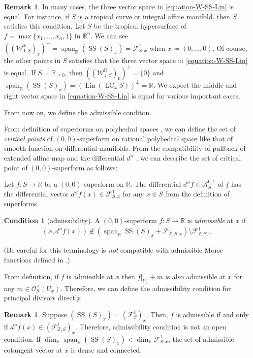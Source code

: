 \documentclass[a4paper,dvipdfmx,reqno,12pt]{amsart}
\theoremstyle{definition}
\newtheorem{remark}[theorem]{Remark}
\newtheorem{condition}[theorem]{Condition}
\newcommand{\deq}{\coloneqq}
\newcommand{\opn}[1]{\operatorname{#1}}
\numberwithin{equation}{section}
\begin{document}
\begin{remark}
In many cases, the three vector space in 
\cref{equation-W-SS-Lin} is equal.
For instance, if $S$ is a tropical curve 
or integral affine manifold, 
then $S$ satisfies this condition.
Let $S$ be the tropical hypersurface of
$f=\max\{x_1,\ldots,x_n,1\}$ in $\mathbb{R}^{n}$. 
We can see
$((\mathcal{W}_{1,S}^{\mathbb{R}})_{x})^{\bot}=\opn{span}_{{\mathbb{R}}}(\opn{SS}(S)_x)=\mathcal{F}_{S,x}^{1}$
when $x\deq (0,\ldots,0)$. 
Of course, the other points in $S$ satisfies 
that the three vector space in 
\cref{equation-W-SS-Lin} is equal. If 
$S=\mathbb{R}_{\geq 0}$, then 
$((\mathcal{W}_{1,S}^{\mathbb{R}})_{0})^{\bot}=\{0\}$ and
$\opn{span}_{\mathbb{R}}(\opn{SS}(S)_x)=
(\opn{Lin}(\opn{LC}_x S))^{\bot}=\mathbb{R}$. 
We expect the middle and right vector space in 
\cref{equation-W-SS-Lin} is equal for various 
important cases.
\end{remark}

From now on, we define the admissible conditon.

From definition of superforms on 
polyhedral spaces 
\cite[Definition 2.10, 2.24]{MR3903579}, we 
can define the set of \emph{critical points} 
of $(0,0)$-superform on rational polyhedral space
like that of smooth function on differential
manifolds.
From the compatibility of pullback of extended
affine map and the differential $d''$
\cite[Lemma 2.21]{MR3903579}, we can 
describe the set of critical point of 
$(0,0)$-superform as follows:

Let $f\colon S \to \mathbb{R}$ be a $(0,0)$-superform on 
$\mathbb{R}$. The differential $d''f\in \mathcal{A}^{0,1}_S$ of $f$ has the 
differential vector $d''f (x)\in \mathcal{F}_{S,x}^{1}$ for any 
$x\in S$ from the definition of superforms.

\begin{condition}[{admissibility}] \label{cond: admissible}
A $(0,0)$-superform $f\colon S \to {\mathbb{R}}$ is \emph{admissible} at $x$ 
if 
\begin{align}
(x,d''f(x))\notin (\opn{span}_{{\mathbb{R}}}
\opn{SS}(S)_x+\mathcal{F}_{\mathbb{Z},S,x}^{1})
\setminus \mathcal{F}_{\mathbb{Z},S,x}^{1}.
\end{align}
\end{condition}

(Be careful for this terminology is \emph{not} 
compatible with admissible Morse functions defined 
in \cite[p.156]{MR1336822}.)

From definition, if $f$ is admissible at $x$ then
$f|_{U_x}+m$ is also admissible at $x$ for any 
$m\in \mathcal{O}_{S}^{\times}(U_x)$.
Therefore, we can define the admissibility condition
for principal divisors directly.
\begin{remark}
Suppose $(\opn{SS}(S)_x)=(\mathcal{F}_{S}^{1})_x$. 
Then, $f$ is admissible if and only if 
$d''f(x)\in (\mathcal{F}_{\mathbb{Z},S}^{1})_x$.
Therefore, admissibility
condition is not an open condition.
If $\dim_{\mathbb{R}} \opn{span}_{{\mathbb{R}}}
(\opn{SS}(S)_x)<\dim_{\mathbb{R}} \mathcal{F}_{S,x}^{1}$, the 
set of admissible cotangent vector at $x$ is dense and 
connected.
\end{remark}
\end{document}
